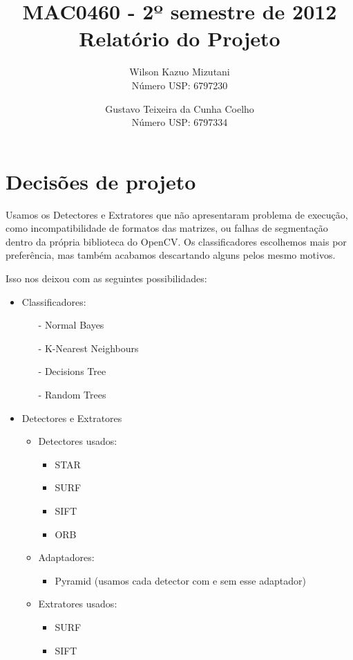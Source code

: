\documentclass[a4paper,11pt]{article}
\title{MAC0460 - 2º semestre de 2012 \\ Relatório do Projeto}
\author{
  Wilson Kazuo Mizutani\\
  Número USP: 6797230
  \and
  Gustavo Teixeira da Cunha Coelho\\
  Número USP: 6797334
}
\begin{document}
\maketitle

\section{Decisões de projeto}

  Usamos os Detectores e Extratores que não apresentaram problema de execução,
  como incompatibilidade de formatos das matrizes, ou falhas de segmentação
  dentro da própria biblioteca do OpenCV. Os classificadores escolhemos mais
  por preferência, mas também acabamos descartando alguns pelos mesmo motivos.  

  Isso nos deixou com as seguintes possibilidades:

  \begin{itemize}
    \item Classificadores:
    \begin{itemize}
      \item[-] Normal Bayes
      \item[-] K-Nearest Neighbours
      \item[-] Decisions Tree
      \item[-] Random Trees
    \end{itemize}
    
    \item Detectores e Extratores
      \begin{itemize}
        \item Detectores usados:
          \begin{itemize}
            \item STAR
            \item SURF
            \item SIFT
            \item ORB\footnotemark
          \end{itemize}
  
        \item Adaptadores:
          \begin{itemize} 
            \item Pyramid (usamos cada detector com e sem esse adaptador)
          \end{itemize}
  
        \item Extratores usados:
          \begin{itemize} 
            \item SURF
            \item SIFT
          \end{itemize}
  
      \end{itemize}
  
  \end{itemize}
  
\end{document}
